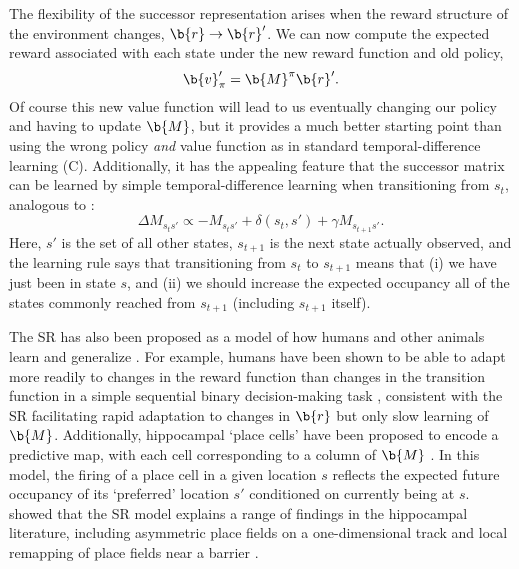 The flexibility of the successor representation arises when the reward structure of the environment changes, $\b{r} \rightarrow \b{r}'$.
We can now compute the expected reward associated with each state under the new reward function and old policy,
\begin{equation}
    \b{v}_\pi' = \b{M}^\pi \b{r}'.
\end{equation}
Of course this new value function will lead to us eventually changing our policy and having to update $\b{M}$, but it provides a much better starting point than using the wrong policy \emph{and} value function as in standard temporal-difference learning (C).
Additionally, it has the appealing feature that the successor matrix can be learned by simple temporal-difference learning when transitioning from $s_t$, analogous to :
\begin{equation}
    \Delta M_{s_t s'} \propto -M_{s_t s'} + \delta(s_t, s') + \gamma M_{s_{t+1} s'}.
\end{equation}
Here, ${s'}$ is the set of all other states, $s_{t+1}$ is the next state actually observed, and the learning rule says that transitioning from $s_t$ to $s_{t+1}$ means that (i) we have just been in state $s$, and (ii) we should increase the expected occupancy all of the states commonly reached from $s_{t+1}$ (including $s_{t+1}$ itself).

The SR has also been proposed as a model of how humans and other animals learn and generalize \citep{momennejad2017successor, stachenfeld2017hippocampus, geerts2020general}.
For example, humans have been shown to be able to adapt more readily to changes in the reward function than changes in the transition function in a simple sequential binary decision-making task \citep{momennejad2017successor}, consistent with the SR facilitating rapid adaptation to changes in $\b{r}$ but only slow learning of $\b{M}$.
Additionally, hippocampal `place cells' have been proposed to encode a predictive map, with each cell corresponding to a column of $\b{M}$ \citep{stachenfeld2017hippocampus}.
In this model, the firing of a place cell in a given location $s$ reflects the expected future occupancy of its `preferred' location $s'$ conditioned on currently being at $s$.
\citet{stachenfeld2017hippocampus} showed that the SR model explains a range of findings in the hippocampal literature, including asymmetric place fields on a one-dimensional track \citep{mehta2000experience} and local remapping of place fields near a barrier \citep{alvernhe2011local}.

